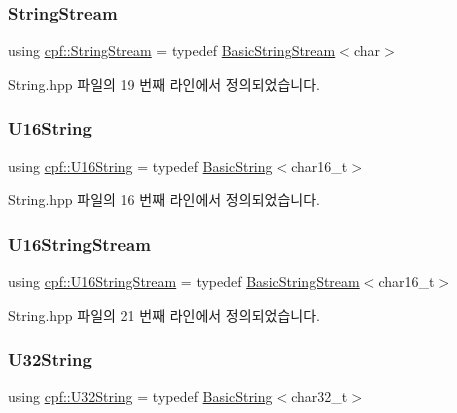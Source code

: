 \subsubsection{\texorpdfstring{String\+Stream}{StringStream}}
{\footnotesize\ttfamily using \hyperlink{namespacecpf_a6e5583a51165e808f1a480563a2d98b2}{cpf\+::\+String\+Stream} = typedef \hyperlink{namespacecpf_a1fe334b3d2422535a1cfe51785d98cb8}{Basic\+String\+Stream}$<$char$>$}



String.\+hpp 파일의 19 번째 라인에서 정의되었습니다.

\mbox{\label{namespacecpf_a32926a91098f8ea8d354b9f234b75acc}} 
\subsubsection{\texorpdfstring{U16\+String}{U16String}}
{\footnotesize\ttfamily using \hyperlink{namespacecpf_a32926a91098f8ea8d354b9f234b75acc}{cpf\+::\+U16\+String} = typedef \hyperlink{namespacecpf_ac91c8c57a370a5bef21ac23f876ad536}{Basic\+String}$<$char16\+\_\+t$>$}



String.\+hpp 파일의 16 번째 라인에서 정의되었습니다.

\mbox{\label{namespacecpf_a401e80bf9227c14c3f1f27121ba489d1}} 
\subsubsection{\texorpdfstring{U16\+String\+Stream}{U16StringStream}}
{\footnotesize\ttfamily using \hyperlink{namespacecpf_a401e80bf9227c14c3f1f27121ba489d1}{cpf\+::\+U16\+String\+Stream} = typedef \hyperlink{namespacecpf_a1fe334b3d2422535a1cfe51785d98cb8}{Basic\+String\+Stream}$<$char16\+\_\+t$>$}



String.\+hpp 파일의 21 번째 라인에서 정의되었습니다.

\mbox{\label{namespacecpf_a71279c3a3d59ed723c48245204f8c0e5}} 
\subsubsection{\texorpdfstring{U32\+String}{U32String}}
{\footnotesize\ttfamily using \hyperlink{namespacecpf_a71279c3a3d59ed723c48245204f8c0e5}{cpf\+::\+U32\+String} = typedef \hyperlink{namespacecpf_ac91c8c57a370a5bef21ac23f876ad536}{Basic\+String}$<$char32\+\_\+t$>$}



